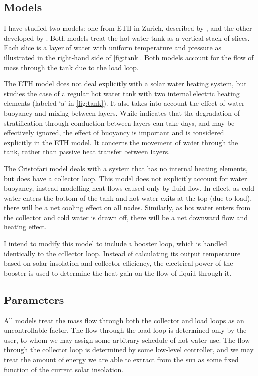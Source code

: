 \documentclass{article}
\begin{document}
\subsection{Models}

I have studied two models: one from ETH in Zurich, described by \textcite{Pfeiffer11}, and the other developed by \textcite{Cristofari02}.
Both models treat the hot water tank as a vertical stack of slices.
Each slice is a layer of water with uniform temperature and pressure as illustrated in the right-hand side of \autoref{fig:tank}.
Both models account for the flow of mass through the tank due to the load loop.

The ETH model does not deal explicitly with a solar water heating system, but studies the case of a regular hot water tank with two internal electric heating elements (labeled `a' in \autoref{fig:tank}).
It also takes into account the effect of water buoyancy and mixing between layers.
While \textcite{Hollands89} indicates that the degradation of stratification through conduction between layers can take days, and may be effectively ignored, the effect of buoyancy is important and is considered explicitly in the ETH model.
It concerns the movement of water through the tank, rather than passive heat transfer between layers.

The Cristofari model deals with a system that has no internal heating elements, but does have a collector loop.
This model does not explicitly account for water buoyancy, instead modelling heat flows caused only by fluid flow.
In effect, as cold water enters the bottom of the tank and hot water exits at the top (due to load), there will be a net cooling effect on all nodes.
Similarly, as hot water enters from the collector and cold water is drawn off, there will be a net downward flow and heating effect.

I intend to modify this model to include a booster loop, which is handled identically to the collector loop.
Instead of calculating its output temperature based on solar insolation and collector efficiency, the electrical power of the booster is used to determine the heat gain on the flow of liquid through it.

\subsection{Parameters}

All models treat the mass flow through both the collector and load loops as an uncontrollable factor.
The flow through the load loop is determined only by the user, to whom we may assign some arbitrary schedule of hot water use.
The flow through the collector loop is determined by some low-level controller, and we may treat the amount of energy we are able to extract from the sun as some fixed function of the current solar insolation.
\end{document}
